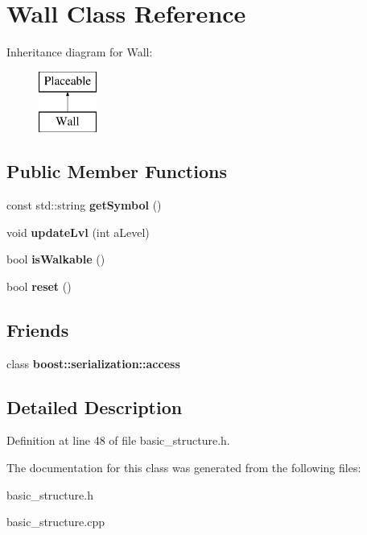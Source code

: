 \hypertarget{class_wall}{}\section{Wall Class Reference}
\label{class_wall}
Inheritance diagram for Wall\+:\begin{figure}[H]
\begin{center}
\leavevmode
\includegraphics[height=2.000000cm]{class_wall}
\end{center}
\end{figure}
\subsection*{Public Member Functions}
\begin{DoxyCompactItemize}
\item 
\hypertarget{class_wall_a0bce0fd16cde6004981b1b63f454278a}{}\label{class_wall_a0bce0fd16cde6004981b1b63f454278a} 
const std\+::string {\bfseries get\+Symbol} ()
\item 
\hypertarget{class_wall_a115c65e30af750fdf1c74392495bac4c}{}\label{class_wall_a115c65e30af750fdf1c74392495bac4c} 
void {\bfseries update\+Lvl} (int a\+Level)
\item 
\hypertarget{class_wall_ab7b0b368cae9727d00125ba37381206a}{}\label{class_wall_ab7b0b368cae9727d00125ba37381206a} 
bool {\bfseries is\+Walkable} ()
\item 
\hypertarget{class_wall_a6320565e6c2d93e2cc1e2aa400d27401}{}\label{class_wall_a6320565e6c2d93e2cc1e2aa400d27401} 
bool {\bfseries reset} ()
\end{DoxyCompactItemize}
\subsection*{Friends}
\begin{DoxyCompactItemize}
\item 
\hypertarget{class_wall_ac98d07dd8f7b70e16ccb9a01abf56b9c}{}\label{class_wall_ac98d07dd8f7b70e16ccb9a01abf56b9c} 
class {\bfseries boost\+::serialization\+::access}
\end{DoxyCompactItemize}


\subsection{Detailed Description}


Definition at line 48 of file basic\+\_\+structure.\+h.



The documentation for this class was generated from the following files\+:\begin{DoxyCompactItemize}
\item 
basic\+\_\+structure.\+h\item 
basic\+\_\+structure.\+cpp\end{DoxyCompactItemize}
